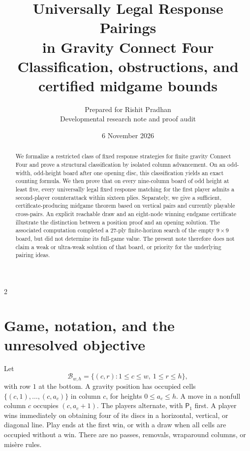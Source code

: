 \documentclass[11pt]{article}
\title{Universally Legal Response Pairings\\in Gravity Connect Four\\[4pt]
\large Classification, obstructions, and certified midgame bounds}
\author{Prepared for Rishit Pradhan\\\small Developmental research note and proof audit}
\date{6 November 2026}
\theoremstyle{definition}
\theoremstyle{remark}
\newcommand{\Pone}{\mathsf{P}_1}
\newcommand{\B}{\mathcal B}
\begin{document}
\maketitle
\vspace{-10pt}
\begin{abstract}
We formalize a restricted class of fixed response strategies for finite gravity
Connect Four and prove a structural classification by isolated column
advancement. On an odd-width, odd-height board after one opening disc, this
classification yields an exact counting formula. We then prove that on every
nine-column board of odd height at least five, every universally legal fixed
response matching for the first player admits a second-player counterattack
within sixteen plies. Separately, we give a sufficient, certificate-producing
midgame theorem based on vertical pairs and currently playable cross-pairs.
An explicit reachable draw and an eight-node winning endgame certificate
illustrate the distinction between a position proof and an opening solution.
The associated computation completed a 27-ply finite-horizon search of the
empty $9\times9$ board, but did not determine its full-game value. The present
note therefore does not claim a weak or ultra-weak solution of that board,
or priority for the underlying pairing ideas.
\end{abstract}
\vspace{3pt}
\begin{center}
\end{center}
{\small
\begin{multicols}{2}
\tableofcontents
\end{multicols}
}
\newpage

\section[Game and unresolved objective]{Game, notation, and the unresolved objective}\label{sec:game}
Let
\[
 \B_{w,h}=\{(c,r):1\le c\le w,\ 1\le r\le h\},
\]
with row $1$ at the bottom. A gravity position has occupied cells
$\{(c,1),\ldots,(c,a_c)\}$ in column $c$, for heights $0\le a_c\le h$.
A move in a nonfull column $c$ occupies $(c,a_c+1)$. The players alternate,
with $\Pone$ first. A player wins immediately on obtaining four of its discs
in a horizontal, vertical, or diagonal line. Play ends at the first win,
or with a draw when all cells are occupied without a win. There are no
passes, removals, wraparound columns, or mis\`ere rules.
\end{document}
